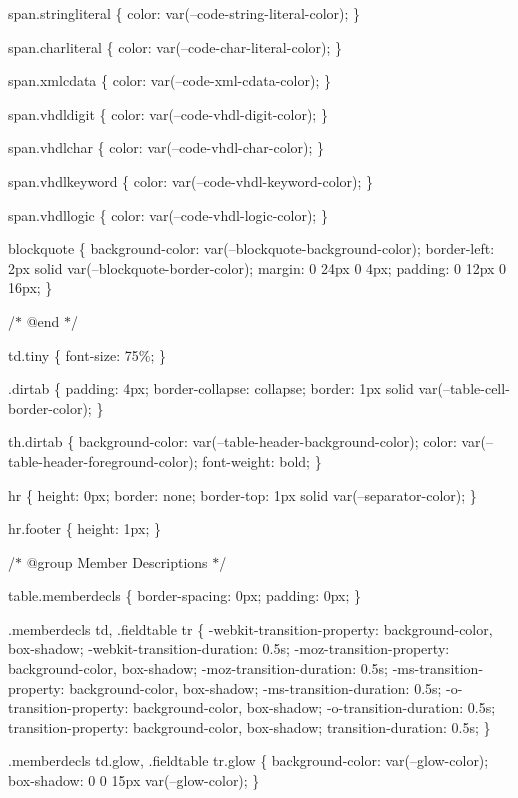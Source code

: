 span.\+stringliteral \{ color\+: var(--code-\/string-\/literal-\/color); \}

span.\+charliteral \{ color\+: var(--code-\/char-\/literal-\/color); \}

span.\+xmlcdata \{ color\+: var(--code-\/xml-\/cdata-\/color); \}

span.\+vhdldigit \{ color\+: var(--code-\/vhdl-\/digit-\/color); \}

span.\+vhdlchar \{ color\+: var(--code-\/vhdl-\/char-\/color); \}

span.\+vhdlkeyword \{ color\+: var(--code-\/vhdl-\/keyword-\/color); \}

span.\+vhdllogic \{ color\+: var(--code-\/vhdl-\/logic-\/color); \}

blockquote \{ background-\/color\+: var(--blockquote-\/background-\/color); border-\/left\+: 2px solid var(--blockquote-\/border-\/color); margin\+: 0 24px 0 4px; padding\+: 0 12px 0 16px; \}

/\texorpdfstring{$\ast$}{*} @end \texorpdfstring{$\ast$}{*}/

td.\+tiny \{ font-\/size\+: 75\%; \}

.dirtab \{ padding\+: 4px; border-\/collapse\+: collapse; border\+: 1px solid var(--table-\/cell-\/border-\/color); \}

th.\+dirtab \{ background-\/color\+: var(--table-\/header-\/background-\/color); color\+: var(--table-\/header-\/foreground-\/color); font-\/weight\+: bold; \}

hr \{ height\+: 0px; border\+: none; border-\/top\+: 1px solid var(--separator-\/color); \}

hr.\+footer \{ height\+: 1px; \}

/\texorpdfstring{$\ast$}{*} @group Member Descriptions \texorpdfstring{$\ast$}{*}/

table.\+memberdecls \{ border-\/spacing\+: 0px; padding\+: 0px; \}

.memberdecls td, .fieldtable tr \{ -\/webkit-\/transition-\/property\+: background-\/color, box-\/shadow; -\/webkit-\/transition-\/duration\+: 0.\+5s; -\/moz-\/transition-\/property\+: background-\/color, box-\/shadow; -\/moz-\/transition-\/duration\+: 0.\+5s; -\/ms-\/transition-\/property\+: background-\/color, box-\/shadow; -\/ms-\/transition-\/duration\+: 0.\+5s; -\/o-\/transition-\/property\+: background-\/color, box-\/shadow; -\/o-\/transition-\/duration\+: 0.\+5s; transition-\/property\+: background-\/color, box-\/shadow; transition-\/duration\+: 0.\+5s; \}

.memberdecls td.\+glow, .fieldtable tr.\+glow \{ background-\/color\+: var(--glow-\/color); box-\/shadow\+: 0 0 15px var(--glow-\/color); \}

